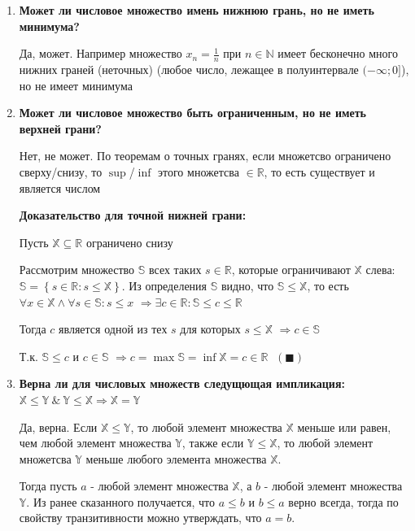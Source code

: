 \documentclass[a4paper,12pt]{article}
\begin{document}
  \begin{enumerate}
    \item {
        \textbf{Может ли числовое множество имень нижнюю грань, но не иметь минимума?}

        Да, может. Например множество $x_n = \frac{1}{n}$ при $n \in \mathbb{N}$ имеет бесконечно много
        нижних граней (неточных) (любое число, лежащее в полуинтервале $(-\infty; 0]$), но не имеет минимума
    }
    \item {
        \textbf{Может ли числовое множество быть ограниченным, но не иметь верхней грани?}

        Нет, не может. По теоремам о точных гранях, если множетсво ограничено сверху/снизу, то
        $\sup$/$\inf$ этого множетсва $\in \mathbb{R}$, то есть существует и является числом

        \textbf{Доказательство для точной нижней грани:} 
        
        Пусть $\mathbb{X} \subseteq \mathbb{R}$ ограничено снизу
    
        Рассмотрим множество $\mathbb{S}$ всех таких $s \in \mathbb{R}$,
        которые ограничивают $\mathbb{X}$ слева:
        $\mathbb{S} = \left\{s \in \mathbb{R}: s \leq \mathbb{X}\right\}$.
        Из определения $\mathbb{S}$ видно, что $\mathbb{S} \leq \mathbb{X}$,
        то есть $\forall x \in \mathbb{X} \land \forall s \in \mathbb{S}: s \leq x$
        $\Rightarrow \exists c \in \mathbb{R}: \mathbb{S} \leq c \leq \mathbb{R}$
    
        Тогда $c$ является одной из тех $s$ для которых $s \leq \mathbb{X}$
        $\Rightarrow c \in \mathbb{S}$

        Т.к. $\mathbb{S} \leq c$ и $c \in \mathbb{S}$
        $\Rightarrow c = \max{\mathbb{S}} = \inf{\mathbb{X}} = c \in \mathbb{R}$
        $\; (\blacksquare)$
    }
    \item {
        \textbf{Верна ли для числовых множеств следущющая импликация: $\mathbb{X} \leq \mathbb{Y} \:\&\: \mathbb{Y} \leq \mathbb{X} \Rightarrow \mathbb{X} = \mathbb{Y}$}
        
        Да, верна. Если $\mathbb{X} \leq \mathbb{Y}$, то любой элемент множества $\mathbb{X}$ меньше или равен,
        чем любой элемент множества $\mathbb{Y}$, также если $\mathbb{Y} \leq \mathbb{X}$, то любой элемент 
        множетсва $\mathbb{Y}$ меньше любого элемента множества $\mathbb{X}$.

        Тогда пусть $a$ - любой элемент множества $\mathbb{X}$, а $b$ - любой элемент множества $\mathbb{Y}$.
        Из ранее сказанного получается, что $a \leq b$ и $b \leq a$ верно всегда, тогда по свойству транзитивности
        можно утверждать, что $a = b$.

}
\end{enumerate}
\end{document}
